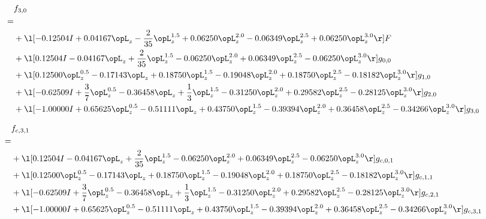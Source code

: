 \begin{alignat}{2} 
\label{eq:f_30_0} 
& f_{3,0} \nonumber \\ 
 = \\ 
& + \l[  -0.12504 I +  0.04167 \opL_z - \frac{2}{35} \opL_z^{1.5} +  0.06250 \opL_z^{2.0}   -0.06349 \opL_z^{2.5} +  0.06250 \opL_z^{3.0}  \r] F \nonumber \\ 
& + \l[  0.12504 I   -0.04167 \opL_z + \frac{2}{35} \opL_z^{1.5}   -0.06250 \opL_z^{2.0} +  0.06349 \opL_z^{2.5}   -0.06250 \opL_z^{3.0}  \r] g_{0,0} \nonumber \\ 
& + \l[  0.12500 \opL_z^{0.5}   -0.17143 \opL_z +  0.18750 \opL_z^{1.5}   -0.19048 \opL_z^{2.0} +  0.18750 \opL_z^{2.5}   -0.18182 \opL_z^{3.0}  \r] g_{1,0} \nonumber \\ 
& + \l[  -0.62509 I + \frac{3}{7} \opL_z^{0.5}   -0.36458 \opL_z + \frac{1}{3} \opL_z^{1.5}   -0.31250 \opL_z^{2.0} +  0.29582 \opL_z^{2.5}   -0.28125 \opL_z^{3.0}  \r] g_{2,0} \nonumber \\ 
& + \l[  -1.00000 I +  0.65625 \opL_z^{0.5}   -0.51111 \opL_z +  0.43750 \opL_z^{1.5}   -0.39394 \opL_z^{2.0} +  0.36458 \opL_z^{2.5}   -0.34266 \opL_z^{3.0}  \r] g_{3,0} \nonumber \\ 
\end{alignat} 


\begin{alignat}{2} 
\label{eq:f_31_0} 
& f_{c,3,1} \nonumber \\ 
 = \\ 
& + \l[  0.12504 I   -0.04167 \opL_z + \frac{2}{35} \opL_z^{1.5}   -0.06250 \opL_z^{2.0} +  0.06349 \opL_z^{2.5}   -0.06250 \opL_z^{3.0}  \r] g_{c,0,1} \nonumber \\ 
& + \l[  0.12500 \opL_z^{0.5}   -0.17143 \opL_z +  0.18750 \opL_z^{1.5}   -0.19048 \opL_z^{2.0} +  0.18750 \opL_z^{2.5}   -0.18182 \opL_z^{3.0}  \r] g_{c,1,1} \nonumber \\ 
& + \l[  -0.62509 I + \frac{3}{7} \opL_z^{0.5}   -0.36458 \opL_z + \frac{1}{3} \opL_z^{1.5}   -0.31250 \opL_z^{2.0} +  0.29582 \opL_z^{2.5}   -0.28125 \opL_z^{3.0}  \r] g_{c,2,1} \nonumber \\ 
& + \l[  -1.00000 I +  0.65625 \opL_z^{0.5}   -0.51111 \opL_z +  0.43750 \opL_z^{1.5}   -0.39394 \opL_z^{2.0} +  0.36458 \opL_z^{2.5}   -0.34266 \opL_z^{3.0}  \r] g_{c,3,1} \nonumber \\ 
\end{alignat} 


